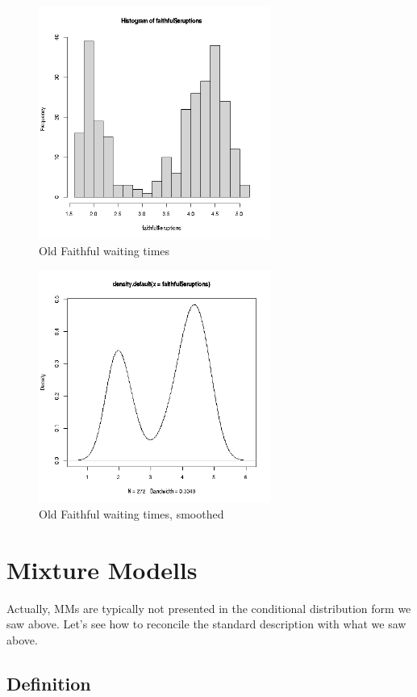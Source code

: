 \documentclass[11pt]{article}
\begin{document}
\begin{figure}[tb]
\centerline{
\includegraphics[width=3.0in]{FaithfulDuration.png}
}
\caption{Old Faithful waiting times}
\label{faithfulhist}
\end{figure}

\begin{figure}[tb]
\centerline{
\includegraphics[width=3.0in]{FaithfulDurationSmooth.png}
}
\caption{Old Faithful waiting times, smoothed}
\label{faithfulhistsmooth}
\end{figure}

\section{Mixture Modells}

Actually, MMs are typically not presented in the conditional distribution
form we saw above.  Let's see how to reconcile the standard description
with what we saw above.

\subsection{Definition}
\end{document}
